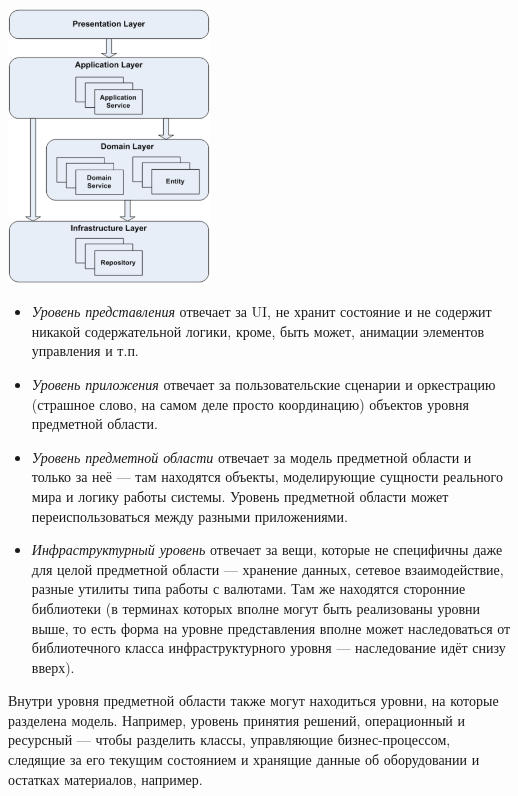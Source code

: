 \documentclass{../../text-style}
\begin{document}
\begin{center}
    \includegraphics[width=0.4\textwidth]{dddLayers.png}
\end{center}

\begin{itemize}
    \item \emph{Уровень представления} отвечает за UI, не хранит состояние и не содержит никакой содержательной логики, кроме, быть может, анимации элементов управления и т.п.
    \item \emph{Уровень приложения} отвечает за пользовательские сценарии и оркестрацию (страшное слово, на самом деле просто координацию) объектов уровня предметной области.
    \item \emph{Уровень предметной области} отвечает за модель предметной области и только за неё --- там находятся объекты, моделирующие сущности реального мира и логику работы системы. Уровень предметной области может переиспользоваться между разными приложениями.
    \item \emph{Инфраструктурный уровень} отвечает за вещи, которые не специфичны даже для целой предметной области --- хранение данных, сетевое взаимодействие, разные утилиты типа работы с валютами. Там же находятся сторонние библиотеки (в терминах которых вполне могут быть реализованы уровни выше, то есть форма на уровне представления вполне может наследоваться от библиотечного класса инфраструктурного уровня --- наследование идёт снизу вверх).
\end{itemize}

Внутри уровня предметной области также могут находиться уровни, на которые разделена модель. Например, уровень принятия решений, операционный и ресурсный --- чтобы разделить классы, управляющие бизнес-процессом, следящие за его текущим состоянием и хранящие данные об оборудовании и остатках материалов, например.
\end{document}
